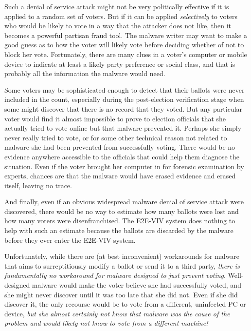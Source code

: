\begin{enumerate}[label={\roman*})]
  Such a denial of service attack might not be very politically
  effective if it is applied to a random set of voters.  But if it can
  be applied \emph{selectively} to voters who would be likely to vote
  in a way that the attacker does not like, then it becomes a powerful
  partisan fraud tool.  The malware writer may want to make a good
  guess as to how the voter will likely vote before deciding whether
  of not to block her vote.  Fortunately, there are many clues in a
  voter’s computer or mobile device to indicate at least a likely
  party preference or social class, and that is probably all the
  information the malware would need.

  Some voters may be sophisticated enough to detect that their ballots
  were never included in the count, especially during the
  post-election verification stage when some might discover that there
  is no record that they voted. But any particular voter would find it
  almost impossible to prove to election officials that she actually
  tried to vote online but that malware prevented it. Perhaps she
  simply never really tried to vote, or for some other technical
  reason not related to malware she had been prevented from
  successfully voting. There would be no evidence anywhere accessible
  to the officials that could help them diagnose the situation. Even
  if the voter brought her computer in for forensic examination by
  experts, chances are that the malware would have erased evidence and
  erased itself, leaving no trace.

  And finally, even if an obvious widespread malware denial of service
  attack were discovered, there would be no way to estimate how many
  ballots were lost and how many voters were disenfranchised. The
  E2E-VIV system does nothing to help with such an estimate because
  the ballots are discarded by the malware before they ever enter the
  E2E-VIV system.

  Unfortunately, while there are (at best inconvenient) workarounds
  for malware that aims to surreptitiously modify a ballot or send it
  to a third party, \emph{there is fundamentally no workaround for
    malware designed to just prevent voting}.  Well-designed malware
  would make the voter believe she had successfully voted, and she
  might never discover until it was too late that she did not. Even if
  she did discover it, the only recourse would be to vote from a
  different, uninfected PC or device, \emph{but she almost certainly
    not know that malware was the cause of the problem and would
    likely not know to vote from a different machine!}


\end{enumerate}
